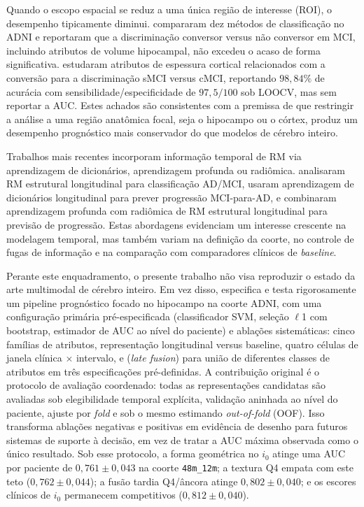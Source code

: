 \documentclass[review]{elsarticle}
\newcommand{\code}[1]{\texttt{#1}}
\begin{document}
Quando o escopo espacial se reduz a uma única região de interesse (ROI), o desempenho tipicamente diminui. \citet{cuingnet-2011} compararam dez métodos de classificação no ADNI e reportaram que a discriminação conversor versus não conversor em MCI, incluindo atributos de volume hipocampal, não excedeu o acaso de forma significativa. \citet{guo-2017a} estudaram atributos de espessura cortical relacionados com a conversão para a discriminação sMCI versus cMCI, reportando $98,84\%$ de acurácia com sensibilidade/especificidade de $97,5/100$ sob LOOCV, mas sem reportar a AUC. Estes achados são consistentes com a premissa de que restringir a análise a uma região anatômica focal, seja o hipocampo ou o córtex, produz um desempenho prognóstico mais conservador do que modelos de cérebro inteiro.

Trabalhos mais recentes incorporam informação temporal de RM via aprendizagem de dicionários, aprendizagem profunda ou radiômica. \citet{zhang-2019} analisaram RM estrutural longitudinal para classificação AD/MCI, \citet{lin-2020} usaram aprendizagem de dicionários longitudinal para prever progressão MCI-para-AD, e \citet{aghajanian-2025} combinaram aprendizagem profunda com radiômica de RM estrutural longitudinal para previsão de progressão. Estas abordagens evidenciam um interesse crescente na modelagem temporal, mas também variam na definição da coorte, no controle de fugas de informação e na comparação com comparadores clínicos de \textit{baseline}.

Perante este enquadramento, o presente trabalho não visa reproduzir o estado da arte multimodal de cérebro inteiro. Em vez disso, especifica e testa rigorosamente um pipeline prognóstico focado no hipocampo na coorte ADNI, com uma configuração primária pré-especificada (classificador SVM, seleção $\ell$1 com bootstrap, estimador de AUC ao nível do paciente) e ablações sistemáticas: cinco famílias de atributos, representação longitudinal versus baseline, quatro células de janela clínica $\times$ intervalo, e (\emph{late fusion}) para união de diferentes classes de atributos em três especificações pré-definidas. A contribuição original é o protocolo de avaliação coordenado: todas as representações candidatas são avaliadas sob elegibilidade temporal explícita, validação aninhada ao nível do paciente, ajuste por \textit{fold} e sob o mesmo estimando \emph{out-of-fold} (OOF). Isso transforma ablações negativas e positivas em evidência de desenho para futuros sistemas de suporte à decisão, em vez de tratar a AUC máxima observada como o único resultado. Sob esse protocolo, a forma geométrica no $i_0$ atinge uma AUC por paciente de $0,761 \pm 0,043$ na coorte \code{48m\_12m}; a textura Q4 empata com este teto ($0,762 \pm 0,044$); a fusão tardia Q4/âncora atinge $0,802 \pm 0,040$; e os escores clínicos de $i_0$ permanecem competitivos ($0,812 \pm 0,040$). 
\end{document}
